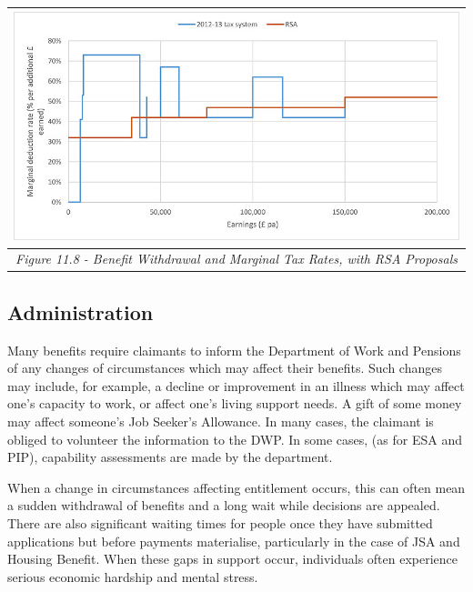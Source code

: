 \documentclass[]{tufte-handout}
\begin{document}
\begin{longtable}[]{@{}c@{}}
\toprule
\begin{minipage}[b]{0.97\columnwidth}\centering
\includegraphics{ChapterPictures/11-8-MTR.png}\strut
\end{minipage}\tabularnewline
\midrule
\endhead
\begin{minipage}[t]{0.97\columnwidth}\centering
\emph{Figure 11.8 - Benefit Withdrawal and Marginal Tax Rates, with RSA
Proposals}\strut
\end{minipage}\tabularnewline
\bottomrule
\end{longtable}

\hypertarget{administration}{%
\subsection{Administration}\label{administration}}

Many benefits require claimants to inform the Department of Work and
Pensions of any changes of circumstances which may affect their
benefits. Such changes may include, for example, a decline or
improvement in an illness which may affect one's capacity to work, or
affect one's living support needs. A gift of some money may affect
someone's Job Seeker's Allowance. In many cases, the claimant is obliged
to volunteer the information to the DWP. In some cases, (as for ESA and
PIP), capability assessments are made by the department.

When a change in circumstances affecting entitlement occurs, this can
often mean a sudden withdrawal of benefits and a long wait while
decisions are appealed. There are also significant waiting times for
people once they have submitted applications but before payments
materialise, particularly in the case of JSA and Housing Benefit. When
these gaps in support occur, individuals often experience serious
economic hardship and mental stress.
\end{document}
